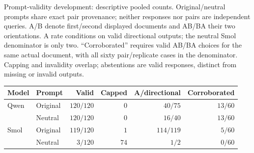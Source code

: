 \begin{supplementtable}
\caption{Prompt-validity development: descriptive pooled counts. Original/neutral prompts share exact pair provenance; neither responses nor pairs are independent queries. A/B denote first/second displayed documents and AB/BA their two orientations. A rate conditions on valid directional outputs; the neutral Smol denominator is only two. ``Corroborated'' requires valid AB/BA choices for the same actual document, with all sixty pair/replicate cases in the denominator. Capping and invalidity overlap; abstentions are valid responses, distinct from missing or invalid outputs.}
\label{tab:si-prompt}
\sncstable
\begin{tabularx}{\linewidth}{@{}lYrrrr@{}}\toprule
Model & Prompt & Valid & Capped & A/directional & Corroborated \\\midrule
Qwen & Original & $120/120$ & $0$ & $40/75$ & $13/60$ \\
& Neutral & $120/120$ & $0$ & $16/40$ & $13/60$ \\
Smol & Original & $119/120$ & $1$ & $114/119$ & $5/60$ \\
& Neutral & $3/120$ & $74$ & $1/2$ & $0/60$ \\\bottomrule
\end{tabularx}
\end{supplementtable}